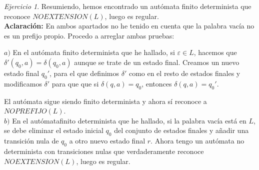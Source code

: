 \documentclass[12pt,spanish]{article}
\theoremstyle{definition}
\theoremstyle{remark}
\newtheorem{exercise}{Ejercicio}%
\begin{document}
\begin{exercise}
  Resumiendo, hemos encontrado un autómata finito determinista que
  reconoce $NOEXTENSION(L)$, luego es regular. \\

  \textbf{Aclaración:} En ambos apartados no he tenido en cuenta que
  la palabra vacía no es un prefijo propio. Procedo a arreglar ambas
  pruebas:

  $a)$ En el autómata finito determinista que he hallado, si
  $\varepsilon \in L$, hacemos que $\delta'(q_0,a)=\delta(q_0,a)$
  aunque se trate de un estado final. Creamos un nuevo estado final
  $q_0'$, para el que definimos $\delta'$ como en el resto de estados
  finales y modificamos $\delta'$ para que que si $\delta(q,a)=q_0$,
  entonces $\delta(q,a)=q_0'$.

  El autómata sigue siendo finito determinista y ahora sí reconoce a
  $NOPREFIJO(L)$. \\

  $b)$ En el autómatafinito determinista que he hallado, si la palabra
  vacía está en $L$, se debe eliminar el estado inicial $q_0$ del
  conjunto de estados finales y añadir una transición nula de $q_0$ a
  otro nuevo estado final $r$. Ahora tengo un autómata no determinista
  con transiciones nulas que verdaderamente reconoce $NOEXTENSION(L)$,
  luego es regular.
\end{exercise}
~
\end{document}
